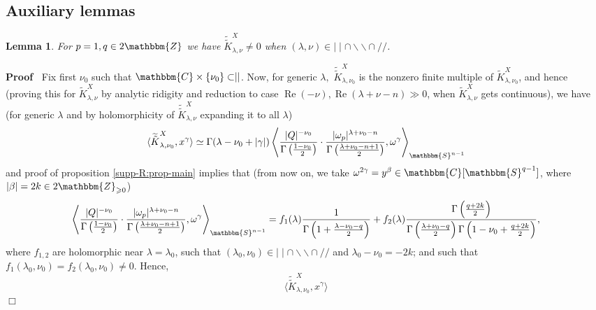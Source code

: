 \documentclass{article}
\newcommand{\tmop}[1]{\ensuremath{\operatorname{#1}}}
\renewenvironment{proof}{\noindent\textbf{Proof\ }}{\hspace*{\fill}$\Box$\medskip}
\newtheorem{lemma}[proposition]{Lemma}
\theoremstyle{remark}
\begin{document}
\subsection{Auxiliary lemmas}

\begin{lemma}
  \label{supp-sing:lem-strangelove}For $p = 1, q \in 2\mathbbm{Z}$ we have
  $\widetilde{\tilde{K}}_{\lambda, \nu}^X \neq 0$ when $(\lambda, \nu) \in
  \mid \mid \cap \backslash\backslash \cap / /$.
\end{lemma}

\begin{proof}
  Fix first $\nu_0$ such that $\mathbbm{C} \times \{ \nu_0 \} \subset \mid
  \mid$. Now, for generic $\lambda,$ $\widetilde{\tilde{K}}_{\lambda,
  \nu_0}^X$ is the nonzero finite multiple of $\tilde{K}_{\lambda, \nu_0}^X$,
  and hence (proving this for $\tilde{K}_{\lambda, \nu}^X$ by analytic
  ridigity and reduction to case $\tmop{Re} (- \nu), \tmop{Re} (\lambda + \nu
  - n) \gg 0$, when $\tilde{K}_{\lambda, \nu}^X$ gets continuous), we have
  (for generic $\lambda$ and by holomorphicity of
  $\widetilde{\tilde{K}}_{\lambda, \nu}^X$ expanding it to all $\lambda$)
  \[ \langle \widetilde{\tilde{K}}_{\lambda, \nu_0}^X, x^{\gamma} \rangle
     \simeq \Gamma (\lambda - \nu_0 + | \gamma |) \left\langle \frac{| Q |^{-
     \nu_0}}{\Gamma \left( \frac{1 - \nu_0}{2} \right)} \cdot \frac{| \omega_p
     |^{\lambda + \nu_0 - n}}{\Gamma \left( \frac{\lambda + \nu_0 - n + 1}{2}
     \right)}, \omega^{\gamma} \right\rangle_{\mathbbm{S}^{n - 1}} \]
  and proof of proposition \ref{supp-R:prop-main} implies that (from now on,
  we take $\omega^{2 \gamma} = y^{\beta} \in \mathbbm{C} [\mathbbm{S}^{q -
  1}]$, where $| \beta | = 2 k \in 2\mathbbm{Z}_{\geqslant 0}$)
  \[ \left\langle \frac{| Q |^{- \nu_0}}{\Gamma \left( \frac{1 - \nu_0}{2}
     \right)} \cdot \frac{| \omega_p |^{\lambda + \nu_0 - n}}{\Gamma \left(
     \frac{\lambda + \nu_0 - n + 1}{2} \right)}, \omega^{\gamma}
     \right\rangle_{\mathbbm{S}^{n - 1}} = f_1 (\lambda) \frac{1}{\Gamma
     \left( 1 + \frac{\lambda - \nu_0 - q}{2} \right)} + f_2 (\lambda)
     \frac{\Gamma \left( \frac{q + 2 k}{2} \right)}{\Gamma \left(
     \frac{\lambda + \nu_0 - q}{2} \right) \Gamma \left( 1 - \nu_0 + \frac{q +
     2 k}{2} \right)}, \]
  where $f_{1, 2}$ are holomorphic near $\lambda = \lambda_0$, such that
  $(\lambda_0, \nu_0) \in \mid \mid \cap \backslash\backslash \cap / /$ and
  $\lambda_0 - \nu_0 = - 2 k$; and such that $f_1 (\lambda_0, \nu_0) = f_2
  (\lambda_0, \nu_0) \neq 0$. Hence,
  \[ \langle \widetilde{\tilde{K}}_{\lambda, \nu_0}^X, x^{\gamma} \rangle
\]
\end{proof}
\end{document}
